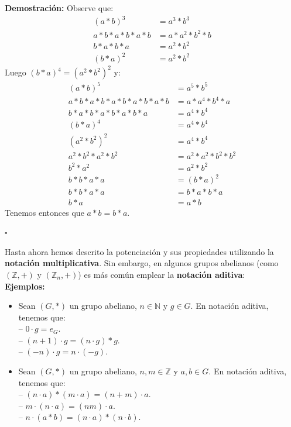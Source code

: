 \documentclass[10 pt]{article}
\begin{document}
\Large{\textbf{Demostración:} Observe que:}
\begin{align*}
    (a*b)^3&=a^3*b^3 \\
    a*b*a*b*a*b&=a*a^2*b^2*b \\
    b*a*b*a&=a^2*b^2 \\
    (b*a)^2&=a^2*b^2 
\end{align*}
\Large{Luego $(b*a)^4=(a^2*b^2)^2$ y:}
\begin{align*}
    (a*b)^5&=a^5*b^5 \\
    a*b*a*b*a*b*a*b*a*b&=a*a^4*b^4*a \\
    b*a*b*a*b*a*b*a&=a^4*b^4 \\
    (b*a)^4&=a^4*b^4 \\
    (a^2*b^2)^2&=a^4*b^4 \\
    a^2*b^2*a^2*b^2&=a^2*a^2*b^2*b^2 \\
    b^2*a^2&=a^2*b^2 \\
    b*b*a*a&=(b*a)^2 \\
    b*b*a*a&=b*a*b*a \\
    b*a&=a*b
\end{align*}
\Large{Tenemos entonces que $a*b=b*a$.} \\

\begin{flushright}
    $\square$
\end{flushright}

\Large{Hasta ahora hemos descrito la potenciación y sus propiedades utilizando la \textbf{notación multiplicativa}. Sin embargo, en algunos grupos abelianos (como $(\mathbb Z,+)$ y $(\mathbb Z_n,+)$) es más común emplear la \textbf{notación aditiva}:} \\

\Large{\textbf{Ejemplos:}} \\

\begin{itemize}
    \item \Large{Sean $(G,*)$ un grupo abeliano, $n \in \mathbb N$ y $g \in G$. En notación aditiva, tenemos que: \\

    -- $0 \cdot g=e_G$. \\

    -- $(n+1) \cdot g=(n \cdot g)*g$. \\

    -- $(-n) \cdot g=n \cdot (-g)$.} \\

    \item \Large{Sean $(G,*)$ un grupo abeliano, $n,m \in \mathbb Z$ y $a,b \in G$. En notación aditiva, tenemos que: \\

    -- $(n \cdot a)*(m \cdot a)=(n+m) \cdot a$. \\

    -- $m \cdot (n \cdot a)=(nm) \cdot a$. \\

    -- $n \cdot (a*b)=(n \cdot a)*(n \cdot b)$.} \\
\end{itemize}
\end{document}
